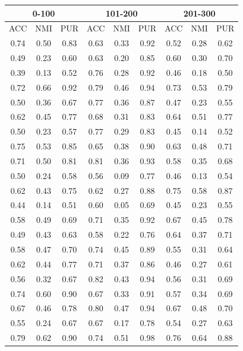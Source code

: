 \documentclass[10pt,final]{IEEEtran}
\begin{document}
\begin{center}
\begin{table}[h!]
\begin{tabular}{|c|c|c|c|c|c|c|c|c|}
    \hline
    \multicolumn{3}{|c|}{0-100} & \multicolumn{3}{|c|}{101-200} & \multicolumn{3}{|c|}{201-300}\\
    \hline
    ACC & NMI & PUR & ACC & NMI & PUR & ACC & NMI & PUR\\
    \hline
    0.74 & 0.50 & 0.83 & 0.63 & 0.33 & 0.92 & 0.52 & 0.28 & 0.62\\
    0.49 & 0.23 & 0.60 & 0.63 & 0.20 & 0.85 & 0.60 & 0.30 & 0.70\\
    0.39 & 0.13 & 0.52 & 0.76 & 0.28 & 0.92 & 0.46 & 0.18 & 0.50\\
    0.72 & 0.66 & 0.92 & 0.79 & 0.46 & 0.94 & 0.73 & 0.53 & 0.79\\
    0.50 & 0.36 & 0.67 & 0.77 & 0.36 & 0.87 & 0.47 & 0.23 & 0.55\\
    0.62 & 0.45 & 0.77 & 0.68 & 0.31 & 0.83 & 0.64 & 0.51 & 0.77\\
    0.50 & 0.23 & 0.57 & 0.77 & 0.29 & 0.83 & 0.45 & 0.14 & 0.52\\
    0.75 & 0.53 & 0.85 & 0.65 & 0.38 & 0.90 & 0.63 & 0.48 & 0.71\\
    0.71 & 0.50 & 0.81 & 0.81 & 0.36 & 0.93 & 0.58 & 0.35 & 0.68\\
    0.50 & 0.24 & 0.58 & 0.56 & 0.09 & 0.77 & 0.46 & 0.13 & 0.54\\
    0.62 & 0.43 & 0.75 & 0.62 & 0.27 & 0.88 & 0.75 & 0.58 & 0.87\\
    0.44 & 0.14 & 0.51 & 0.60 & 0.05 & 0.69 & 0.45 & 0.23 & 0.55\\
    0.58 & 0.49 & 0.69 & 0.71 & 0.35 & 0.92 & 0.67 & 0.45 & 0.78\\
    0.49 & 0.43 & 0.63 & 0.58 & 0.22 & 0.76 & 0.64 & 0.37 & 0.71\\
    0.58 & 0.47 & 0.70 & 0.74 & 0.45 & 0.89 & 0.55 & 0.31 & 0.64\\
    0.62 & 0.44 & 0.77 & 0.71 & 0.37 & 0.86 & 0.46 & 0.27 & 0.61\\
    0.56 & 0.32 & 0.67 & 0.82 & 0.43 & 0.94 & 0.56 & 0.31 & 0.69\\
    0.74 & 0.60 & 0.90 & 0.67 & 0.33 & 0.91 & 0.57 & 0.34 & 0.69\\
    0.67 & 0.46 & 0.78 & 0.80 & 0.47 & 0.94 & 0.67 & 0.48 & 0.70\\
    0.55 & 0.24 & 0.67 & 0.67 & 0.17 & 0.78 & 0.54 & 0.27 & 0.63\\
    0.79 & 0.62 & 0.90 & 0.74 & 0.51 & 0.98 & 0.76 & 0.64 & 0.88\\

\end{tabular}
\end{table}
\end{center}
\end{document}
